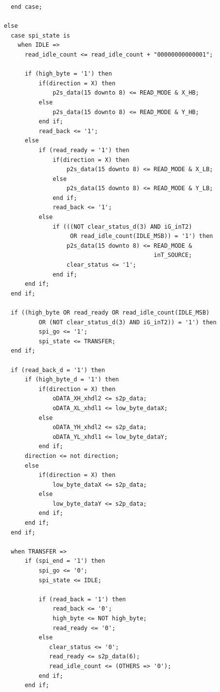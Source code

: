 \documentclass[12pt,a4paper,hyperlinks]{rapport_unif}
\begin{document}
\begin{lstlisting}
        end case;

      else
        case spi_state is
          when IDLE =>
            read_idle_count <= read_idle_count + "00000000000001";
							
            if (high_byte = '1') then
                if(direction = X) then
                    p2s_data(15 downto 8) <= READ_MODE & X_HB;
                else
                    p2s_data(15 downto 8) <= READ_MODE & Y_HB;
                end if;
                read_back <= '1'; 
            else
                if (read_ready = '1') then
                    if(direction = X) then
                        p2s_data(15 downto 8) <= READ_MODE & X_LB;
                    else
                        p2s_data(15 downto 8) <= READ_MODE & Y_LB;
                    end if;
                    read_back <= '1';    
                else
                    if (((NOT clear_status_d(3) AND iG_inT2) 
                         OR read_idle_count(IDLE_MSB)) = '1') then
		                p2s_data(15 downto 8) <= READ_MODE & 
		                                         inT_SOURCE;    
		                clear_status <= '1';  
                    end if;
		    end if;
	    end if;
						
        if ((high_byte OR read_ready OR read_idle_count(IDLE_MSB) 
                OR (NOT clear_status_d(3) AND iG_inT2)) = '1') then
              	spi_go <= '1';    
              	spi_state <= TRANSFER;    
        end if;
						
        if (read_back_d = '1') then
            if (high_byte_d = '1') then
                if(direction = X) then
		            oDATA_XH_xhdl2 <= s2p_data;    
		            oDATA_XL_xhdl1 <= low_byte_dataX;    
		        else
		            oDATA_YH_xhdl2 <= s2p_data;    
		            oDATA_YL_xhdl1 <= low_byte_dataY; 
                end if;
            direction <= not direction;
            else
                if(direction = X) then
                    low_byte_dataX <= s2p_data;    
                else
                    low_byte_dataY <= s2p_data;
                end if;
            end if;
        end if;
							
        when TRANSFER =>
            if (spi_end = '1') then
                spi_go <= '0';    
                spi_state <= IDLE;	
						
                if (read_back = '1') then
                    read_back <= '0';
                    high_byte <= NOT high_byte;
                    read_ready <= '0';    	   
                else
                   clear_status <= '0';    
                   read_ready <= s2p_data(6);  
                   read_idle_count <= (OTHERS => '0');    
                end if;
            end if;
            

\end{lstlisting}
\end{document}
